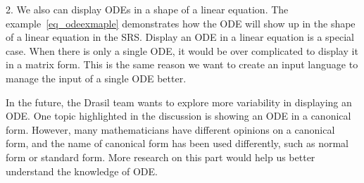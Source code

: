 2. We also can display ODEs in a shape of a linear equation. The example~\ref{eq_odeexmaple} demonstrates how the ODE will show up in the shape of a linear equation in the SRS. Display an ODE in a linear equation is a special case. When there is only a single ODE, it would be over complicated to display it in a matrix form. This is the same reason we want to create an input language to manage the input of a single ODE better.

In the future, the Drasil team wants to explore more variability in displaying an ODE. One topic highlighted in the discussion is showing an ODE in a canonical form. However, many mathematicians have different opinions on a canonical form, and the name of canonical form has been used differently, such as normal form or standard form. More research on this part would help us better understand the knowledge of ODE.

